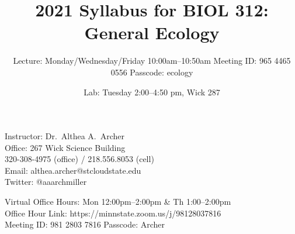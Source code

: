\documentclass{tufte-handout}
\title{2021 Syllabus for BIOL 312: General Ecology}										%
\author{Lecture: Monday/Wednesday/Friday 10:00am--10:50am 
\color{red} Meeting ID: 965 4465 0556
Passcode: ecology \color{black}}								%
\date{Lab: Tuesday 2:00--4:50 pm, Wick 287}
\begin{document}
\maketitle

Instructor: Dr.~Althea A.~Archer\\
Office: 267 Wick Science Building\\
320-308-4975 (office) / 218.556.8053 (cell)\\
Email: althea.archer@stcloudstate.edu\\
Twitter: @aaarchmiller

\color{gray} Virtual Office Hours: Mon 12:00pm--2:00pm \& Th 1:00--2:00pm\\
Office Hour Link: https://minnstate.zoom.us/j/98128037816\\
Meeting ID: 981 2803 7816 Passcode: Archer \color{black}
\end{document}
